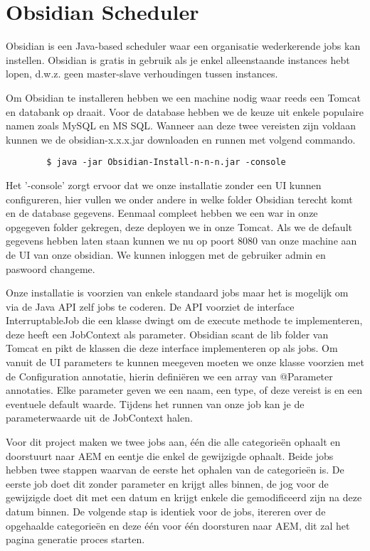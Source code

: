 
	\section{Obsidian Scheduler}
	Obsidian is een Java-based scheduler waar een organisatie wederkerende jobs kan instellen. Obsidian is gratis in gebruik als je enkel alleenstaande instances hebt lopen, d.w.z. geen master-slave verhoudingen tussen instances.
	\par
	Om Obsidian te installeren hebben we een machine nodig waar reeds een Tomcat en databank op draait. Voor de database hebben we de keuze uit enkele populaire namen zoals MySQL en MS SQL. Wanneer aan deze twee vereisten zijn voldaan kunnen we de obsidian-x.x.x.jar downloaden en runnen met volgend commando. 
	\begin{lstlisting}
		$ java -jar Obsidian-Install-n-n-n.jar -console
	\end{lstlisting}
	Het '-console' zorgt ervoor dat we onze installatie zonder een UI kunnen configureren, hier vullen we onder andere in welke folder Obsidian terecht komt en de database gegevens. Eenmaal compleet hebben we een war in onze opgegeven folder gekregen, deze deployen we in onze Tomcat. Als we de default gegevens hebben laten staan kunnen we nu op poort 8080 van onze machine aan de UI van onze obsidian. We kunnen inloggen met de gebruiker admin en paswoord changeme.
	\par
	Onze installatie is voorzien van enkele standaard jobs maar het is mogelijk om via de Java API zelf jobs te coderen. De API voorziet de interface InterruptableJob die een klasse dwingt om de execute methode te implementeren, deze heeft een JobContext als parameter. Obsidian scant de lib folder van Tomcat en pikt de klassen die deze interface implementeren op als jobs. Om vanuit de UI parameters te kunnen meegeven moeten we onze klasse voorzien met de Configuration annotatie, hierin defini\"eren we een array van @Parameter annotaties. Elke parameter geven we een naam, een type, of deze vereist is en een eventuele default waarde. Tijdens het runnen van onze job kan je de parameterwaarde uit de JobContext halen.
	\par
	Voor dit project maken we twee jobs aan, \'e\'en die alle categorie\"en ophaalt en doorstuurt naar AEM en eentje die enkel de gewijzigde ophaalt. Beide jobs hebben twee stappen waarvan de eerste het ophalen van de categorie\"en is. De eerste job doet dit zonder parameter en krijgt alles binnen, de jog voor de gewijzigde doet dit met een datum en krijgt enkele die gemodificeerd zijn na deze datum binnen. De volgende stap is identiek voor de jobs, itereren over de opgehaalde categorieën en deze \'e\'en voor \'e\'en doorsturen naar AEM, dit zal het pagina generatie proces starten.
